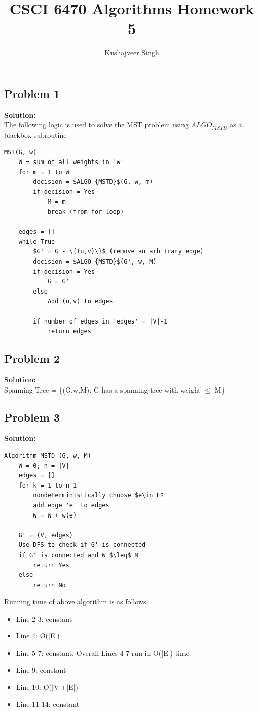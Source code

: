 \documentclass[12pt,a4paper]{article}
\title{CSCI 6470 Algorithms Homework 5}
\author{Kushajveer Singh}
\date{}
\newcommand{\solution}{\noindent\textbf{Solution:}\\\indent}
\begin{document}
\maketitle

\subsection*{Problem 1}
\solution
The following logic is used to solve the MST problem using $ALGO_{MSTD}$ as a blackbox subroutine

\begin{lstlisting}[mathescape=true]
MST(G, w)
    W = sum of all weights in 'w'
    for m = 1 to W
        decision = $ALGO_{MSTD}$(G, w, m)
        if decision = Yes
            M = m
            break (from for loop)
    
    edges = []
    while True
        $G' = G - \{(u,v)\}$ (remove an arbitrary edge)
        decision = $ALGO_{MSTD}$(G', w, M)
        if decision = Yes
            G = G'
        else
            Add (u,v) to edges
        
        if number of edges in 'edges' = |V|-1
            return edges
\end{lstlisting}

\subsection*{Problem 2}
\solution
Spanning Tree = \{(G,w,M): G has a spanning tree with weight $\leq$ M\}

\newpage
\subsection*{Problem 3}
\solution
\begin{lstlisting}[mathescape=true]
Algorithm MSTD (G, w, M)
    W = 0; n = |V|
    edges = []
    for k = 1 to n-1
        nondeterministically choose $e\in E$
        add edge 'e' to edges
        W = W + w(e)
    
    G' = (V, edges)
    Use DFS to check if G' is connected
    if G' is connected and W $\leq$ M
        return Yes
    else
        return No
\end{lstlisting}

Running time of above algorithm is as follows
\begin{itemize}
    \item Line 2-3: constant
    \item Line 4: O(|E|)
    \item Line 5-7: constant. Overall Lines 4-7 run in O(|E|) time
    \item Line 9: constant
    \item Line 10: O(|V|+|E|)
    \item Line 11-14: constant
\end{itemize}
\end{document}

